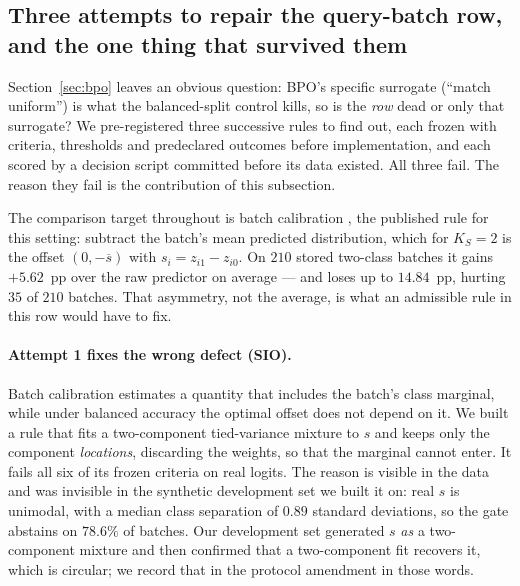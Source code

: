 \subsection{Three attempts to repair the query-batch row, and the one thing that
survived them}
\label{sec:repair}

Section~\ref{sec:bpo} leaves an obvious question: BPO's specific surrogate
(``match uniform'') is what the balanced-split control kills, so is the \emph{row}
dead or only that surrogate? We pre-registered three successive rules to find out,
each frozen with criteria, thresholds and predeclared outcomes before implementation,
and each scored by a decision script committed before its data existed. All three
fail. The reason they fail is the contribution of this subsection.

The comparison target throughout is batch calibration \citep{zhou2024batch}, the
published rule for this setting: subtract the batch's mean predicted distribution,
which for $K_S=2$ is the offset $(0,-\overline{s})$ with $s_i=z_{i1}-z_{i0}$. On
$210$ stored two-class batches it gains $\mathbf{+5.62}$~pp over the raw predictor on
average --- and loses up to $\mathbf{14.84}$~pp, hurting $35$ of $210$ batches. That
asymmetry, not the average, is what an admissible rule in this row would have to fix.

\paragraph{Attempt 1 fixes the wrong defect (SIO).}
Batch calibration estimates a quantity that includes the batch's class marginal,
while under balanced accuracy the optimal offset does not depend on it. We built a
rule that fits a two-component tied-variance mixture to $s$ and keeps only the
component \emph{locations}, discarding the weights, so that the marginal cannot
enter. It fails all six of its frozen criteria on real logits. The reason is visible
in the data and was invisible in the synthetic development set we built it on: real
$s$ is unimodal, with a median class separation of $0.89$ standard deviations, so the
gate abstains on $78.6\%$ of batches. Our development set generated $s$ \emph{as} a
two-component mixture and then confirmed that a two-component fit recovers it, which
is circular; we record that in the protocol amendment in those words.

